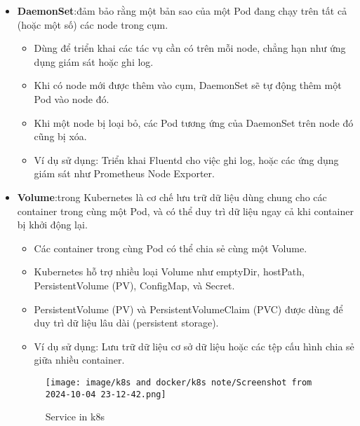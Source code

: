 \documentclass[a4paper,12pt]{article}
\begin{document}
\begin{itemize}
    
    \item \textbf{DaemonSet}:đảm bảo rằng một bản sao của một Pod đang chạy trên tất cả (hoặc một số) các node trong cụm.
    \begin{itemize}
        \item Dùng để triển khai các tác vụ cần có trên mỗi node, chẳng hạn như ứng dụng giám sát hoặc ghi log. 
        \item Khi có node mới được thêm vào cụm, DaemonSet sẽ tự động thêm một Pod vào node đó.
        \item Khi một node bị loại bỏ, các Pod tương ứng của DaemonSet trên node đó cũng bị xóa.
        \item Ví dụ sử dụng: Triển khai Fluentd cho việc ghi log, hoặc các ứng dụng giám sát như Prometheus Node Exporter.
    \end{itemize}






    
    \item \textbf{Volume}:trong Kubernetes là cơ chế lưu trữ dữ liệu dùng chung cho các container trong cùng một Pod, và có thể duy trì dữ liệu ngay cả khi container bị khởi động lại.
    \begin{itemize}
        \item Các container trong cùng Pod có thể chia sẻ cùng một Volume.
        \item Kubernetes hỗ trợ nhiều loại Volume như emptyDir, hostPath, PersistentVolume (PV), ConfigMap, và Secret.
        \item PersistentVolume (PV) và PersistentVolumeClaim (PVC) được dùng để duy trì dữ liệu lâu dài (persistent storage).
        \item Ví dụ sử dụng: Lưu trữ dữ liệu cơ sở dữ liệu hoặc các tệp cấu hình chia sẻ giữa nhiều container.
    \end{itemize}


\begin{figure}[htbp]
    \centering
    \texttt{[image: image/k8s and docker/k8s note/Screenshot from 2024-10-04 23-12-42.png]}
    \caption{Service in k8s}
    \label{}
\end{figure}





\end{itemize}
\end{document}
